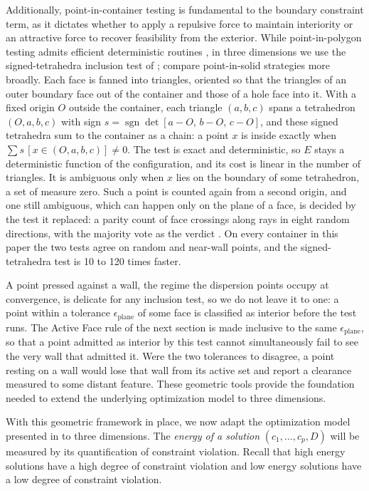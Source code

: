 \documentclass[preprint,12pt]{elsarticle}
\theoremstyle{remark}
\begin{document}
Additionally, point-in-container testing is fundamental to the boundary
constraint term, as it dictates whether to apply a repulsive force to maintain
interiority or an attractive force to recover feasibility from the exterior.
While point-in-polygon testing admits efficient deterministic routines
\citep{wang2005}, in three dimensions we use the signed-tetrahedra inclusion
test of \citet{feito1997}; \citet{ogayar2005} compare point-in-solid strategies
more broadly. Each face is fanned into triangles, oriented so that the triangles
of an outer boundary face out of the container and those of a hole face into it.
With a fixed origin $O$ outside the container, each triangle $(a, b, c)$ spans a
tetrahedron $(O, a, b, c)$ with sign $s = \operatorname{sgn} \det[a - O,\, b -
O,\, c - O]$, and these signed tetrahedra sum to the container as a chain: a
point $x$ is inside exactly when $\sum s \, [x \in (O, a, b, c)] \ne 0$. The
test is exact and deterministic, so $E$ stays a deterministic function of the
configuration, and its cost is linear in the number of triangles. It is
ambiguous only when $x$ lies on the boundary of some tetrahedron, a set of
measure zero. Such a point is counted again from a second origin, and one still
ambiguous, which can happen only on the plane of a face, is decided by the test
it replaced: a parity count of face crossings along rays in eight random
directions, with the majority vote as the verdict \citep{nooruddin2003}. On
every container in this paper the two tests agree on random and near-wall
points, and the signed-tetrahedra test is 10 to 120 times faster.

A point pressed against a wall, the regime the dispersion points occupy at
convergence, is delicate for any inclusion test, so we do not leave it to one: a
point within a tolerance $\epsilon_{\text{plane}}$ of some face is classified as
interior before the test runs. The Active Face rule of the next section is made
inclusive to the same $\epsilon_{\text{plane}}$, so that a point admitted as
interior by this test cannot simultaneously fail to see the very wall that
admitted it. Were the two tolerances to disagree, a point resting on a wall
would lose that wall from its active set and report a clearance measured to some
distant feature. These geometric tools provide the foundation needed to extend
the underlying optimization model to three dimensions.

With this geometric framework in place, we now adapt the optimization model
presented in \citet{lai2024} to three dimensions. The \textit{energy of a
solution} $(c_1, \dots, c_p, D)$ will be measured by its quantification of
constraint violation. Recall that high energy solutions have a high degree of
constraint violation and low energy solutions have a low degree of constraint
violation.
\end{document}
